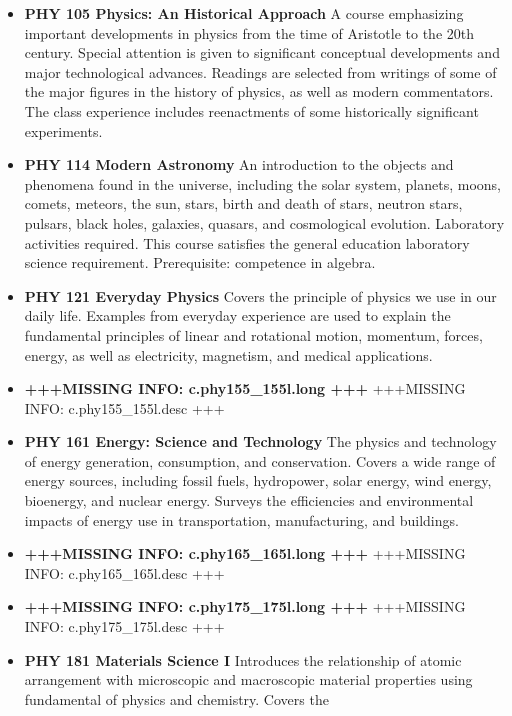 \documentclass[
  letterpaper,
]{scrbook}
\providecommand{\tightlist}{%
  \setlength{\itemsep}{0pt}\setlength{\parskip}{0pt}}
\begin{document}
\begin{itemize}
\tightlist
\item
  \textbf{PHY 105 Physics: An Historical Approach} A course emphasizing
  important developments in physics from the time of Aristotle to the
  20th century. Special attention is given to significant conceptual
  developments and major technological advances. Readings are selected
  from writings of some of the major figures in the history of physics,
  as well as modern commentators. The class experience includes
  reenactments of some historically significant experiments.
\item
  \textbf{PHY 114 Modern Astronomy} An introduction to the objects and
  phenomena found in the universe, including the solar system, planets,
  moons, comets, meteors, the sun, stars, birth and death of stars,
  neutron stars, pulsars, black holes, galaxies, quasars, and
  cosmological evolution. Laboratory activities required. This course
  satisfies the general education laboratory science requirement.
  Prerequisite: competence in algebra.\\
\item
  \textbf{PHY 121 Everyday Physics} Covers the principle of physics we
  use in our daily life. Examples from everyday experience are used to
  explain the fundamental principles of linear and rotational motion,
  momentum, forces, energy, as well as electricity, magnetism, and
  medical applications.
\item
  \textbf{+++MISSING INFO: c.phy155\_155l.long +++} +++MISSING INFO:
  c.phy155\_155l.desc +++
\item
  \textbf{PHY 161 Energy: Science and Technology} The physics and
  technology of energy generation, consumption, and conservation. Covers
  a wide range of energy sources, including fossil fuels, hydropower,
  solar energy, wind energy, bioenergy, and nuclear energy. Surveys the
  efficiencies and environmental impacts of energy use in
  transportation, manufacturing, and buildings.\\
\item
  \textbf{+++MISSING INFO: c.phy165\_165l.long +++} +++MISSING INFO:
  c.phy165\_165l.desc +++
\item
  \textbf{+++MISSING INFO: c.phy175\_175l.long +++} +++MISSING INFO:
  c.phy175\_175l.desc +++
\item
  \textbf{PHY 181 Materials Science I} Introduces the relationship of
  atomic arrangement with microscopic and macroscopic material
  properties using fundamental of physics and chemistry. Covers the

\end{itemize}
\end{document}
